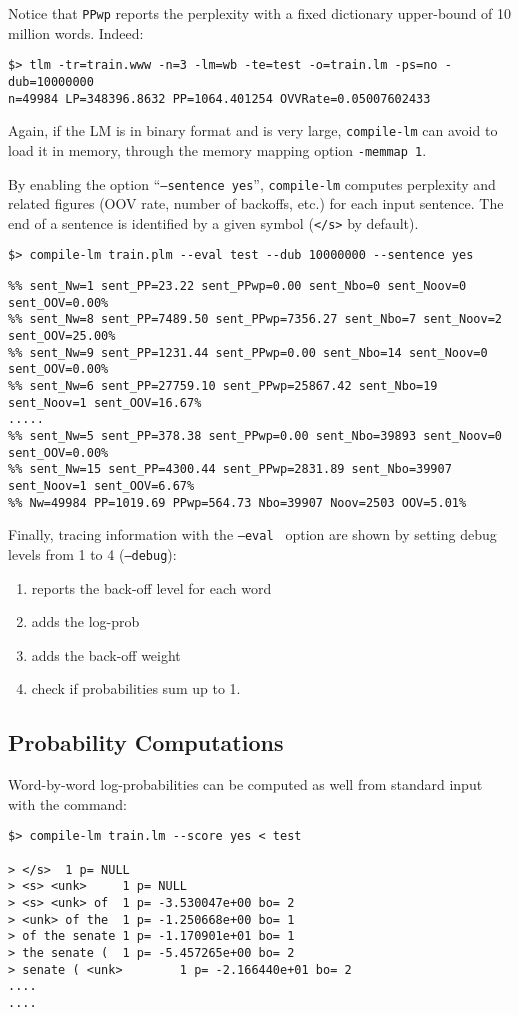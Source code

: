 \noindent
Notice that {\tt PPwp} reports the perplexity with a fixed dictionary upper-bound of 10 million words. Indeed:
\begin{verbatim}
$> tlm -tr=train.www -n=3 -lm=wb -te=test -o=train.lm -ps=no -dub=10000000 
n=49984 LP=348396.8632 PP=1064.401254 OVVRate=0.05007602433
\end{verbatim}

\bigskip
\noindent
Again, if the LM is in binary format and is very large, {\tt compile-lm} can avoid to load it in memory,
through the memory mapping option {\tt -memmap 1}.

\bigskip
\noindent
By enabling the option ``{\tt --sentence yes}'', {\tt compile-lm} computes perplexity and related figures (OOV rate, number of backoffs, etc.) for each input sentence. The end of a sentence is identified by a given symbol ({\tt </s>} by default).
\begin{verbatim}
$> compile-lm train.plm --eval test --dub 10000000 --sentence yes	
\end{verbatim}
{\small 
\begin{verbatim}
%% sent_Nw=1 sent_PP=23.22 sent_PPwp=0.00 sent_Nbo=0 sent_Noov=0 sent_OOV=0.00%
%% sent_Nw=8 sent_PP=7489.50 sent_PPwp=7356.27 sent_Nbo=7 sent_Noov=2 sent_OOV=25.00%
%% sent_Nw=9 sent_PP=1231.44 sent_PPwp=0.00 sent_Nbo=14 sent_Noov=0 sent_OOV=0.00%
%% sent_Nw=6 sent_PP=27759.10 sent_PPwp=25867.42 sent_Nbo=19 sent_Noov=1 sent_OOV=16.67%
.....
%% sent_Nw=5 sent_PP=378.38 sent_PPwp=0.00 sent_Nbo=39893 sent_Noov=0 sent_OOV=0.00%
%% sent_Nw=15 sent_PP=4300.44 sent_PPwp=2831.89 sent_Nbo=39907 sent_Noov=1 sent_OOV=6.67%
%% Nw=49984 PP=1019.69 PPwp=564.73 Nbo=39907 Noov=2503 OOV=5.01%
\end{verbatim}
}

\bigskip
\noindent
Finally, tracing information with the {\tt --eval }  option are shown by setting 
debug levels from 1 to 4 ({\tt --debug}):
\begin{enumerate}
\item reports the back-off level for each word
\item adds the log-prob 
\item adds the back-off weight
\item check if probabilities sum up to 1.
\end{enumerate}


\subsection{Probability Computations}
Word-by-word log-probabilities  can be computed as well from standard input with the command:
\begin{verbatim}
$> compile-lm train.lm --score yes < test

> </s>  1 p= NULL
> <s> <unk>     1 p= NULL
> <s> <unk> of  1 p= -3.530047e+00 bo= 2
> <unk> of the  1 p= -1.250668e+00 bo= 1
> of the senate 1 p= -1.170901e+01 bo= 1
> the senate (  1 p= -5.457265e+00 bo= 2
> senate ( <unk>        1 p= -2.166440e+01 bo= 2
....
....
\end{verbatim}

